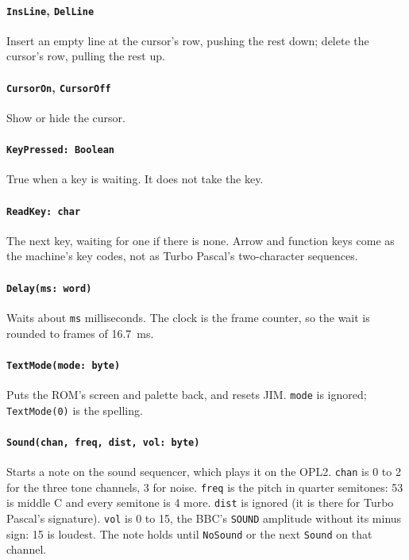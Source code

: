 \paragraph{\texttt{InsLine}, \texttt{DelLine}} Insert an empty line at the
cursor's row, pushing the rest down; delete the cursor's row, pulling the rest
up.

\paragraph{\texttt{CursorOn}, \texttt{CursorOff}} Show or hide the cursor.

\paragraph{\texttt{KeyPressed: Boolean}} True when a key is waiting. It does
not take the key.

\paragraph{\texttt{ReadKey: char}} The next key, waiting for one if there is
none. Arrow and function keys come as the machine's key codes, not as Turbo
Pascal's two-character sequences.

\paragraph{\texttt{Delay(ms: word)}} Waits about \verb|ms| milliseconds. The
clock is the frame counter, so the wait is rounded to frames of 16.7~ms.

\paragraph{\texttt{TextMode(mode: byte)}} Puts the ROM's screen and palette
back, and resets JIM. \verb|mode| is ignored; \verb|TextMode(0)| is the
spelling.

\paragraph{\texttt{Sound(chan, freq, dist, vol: byte)}} Starts a note on the
sound sequencer, which plays it on the OPL2. \verb|chan| is 0 to 2 for the
three tone channels, 3 for noise. \verb|freq| is the pitch in quarter
semitones: 53 is middle C and every semitone is 4 more. \verb|dist| is
ignored (it is there for Turbo Pascal's signature). \verb|vol| is 0 to 15,
the BBC's \verb|SOUND| amplitude without its minus sign: 15 is loudest. The
note holds until \verb|NoSound| or the next \verb|Sound| on that channel.

